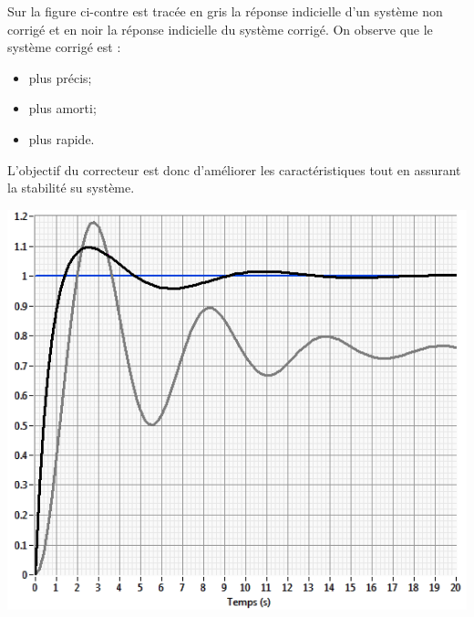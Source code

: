 \documentclass[10pt,fleqn]{article} %
\begin{document}
\noindent
\begin{minipage}[c]{.6\linewidth}
\hspace{.4cm} Sur la figure ci-contre est tracée en gris la réponse indicielle d'un système non corrigé et en noir la réponse indicielle du système corrigé. On observe que le système corrigé est :
\begin{itemize}
\item plus précis;
\item plus amorti;
\item plus rapide. 
\end{itemize}
L'objectif du correcteur est donc d'améliorer les caractéristiques tout en assurant la stabilité su système.
\end{minipage} \hfill
\begin{minipage}[c]{.35\linewidth}
\begin{center}
\includegraphics[width=\linewidth]{images/fig_03}
\end{center}
\end{minipage} 
\end{document}
